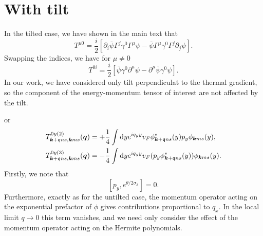 \section{With tilt}
In the tilted case, we have shown in the main text that 
\[
  T^{\mu 0} = \frac{i}{2}
  \left[\partial_i \bar{\psi} \Gamma^j \gamma^0 \Gamma^{\mu} \psi
    - \bar{\psi} \Gamma^{\mu} \gamma^0 \Gamma^j \partial_j \psi
  \right].
\]
Swapping the indices, we have for \( \mu \neq 0 \)~\cite{vanderwurffMagnetovorticalThermoelectricTransport2019}
\[
  T^{0 i} = \frac{i}{2} [\bar{\psi} \gamma^0 \partial^{\mu } \psi
  - \partial^{\mu }\bar{\psi} \gamma^{0 } \psi ].
\]
In our work, we have considered only tilt perpendiculat to the thermal gradient,  so the component of the energy-momentum tensor of interest are not affected by the tilt.

or
\begin{align}
  T_{\bm{k} + \mathfrak{q} ns, \bm{k} ms}^{0y (2)} (\bm{q}) &=
                                                             + \frac{1}{4} \int \mathrm{d} y
                                                             e^{iq_{y} y} v_{F}
                                                             \phi ^{*}_{\bm{k}+\mathfrak{q} ns} (y) p_{y} \phi _{\bm{k} m s} (y),\\
  T_{\bm{k} + \mathfrak{q} ns, \bm{k} ms}^{0y (3)} (\bm{q}) &=
                                                             - \frac{1}{4} \int \mathrm{d} y
                                                             e^{iq_{y} y} v_{F}
                                                             (p_{y} \phi ^{*}_{\bm{k}+\mathfrak{q} ns} (y))  \phi _{\bm{k} m s} (y).
\end{align}
Firstly, we note that
\[
  [p_{y} , e^{\theta /2 \sigma _{x}}] = 0.
\]
Furthermore, exactly as for the untilted case, the momentum operator acting on the exponential prefactor of \(\phi \) gives contributions proportional to \(q_{x}\).
In the local limit \(q\to  0\) this term vanishes, and we need only consider the effect of the momentum operator acting on the Hermite polynomials.

